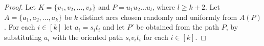\documentclass[10pt,a4paper]{amsart}
\newcommand{\AYr}[1]{{#1}}
\newcommand{\QGr}[1]{{#1}}
\begin{document}
    \begin{proof}
		
        \AYr{  Let $K=\{v_1,v_2,\dots,v_k\}$ and  $P = u_1u_2\ldots u_{l}$, where $l \geq k+2$. Let $A=\{a_1,a_2,\ldots,a_k\}$ be $k$ distinct arcs chosen randomly  and uniformly from $A(P)$. For each $i \in [k]$ let $a_i=s_it_i$ and let $P'$ be obtained from the path $P$,
        by substituting $a_i$ with the oriented path $s_i v_i t_i$ for each $i \in [k]$.
        
}
\end{proof}
\end{document}
